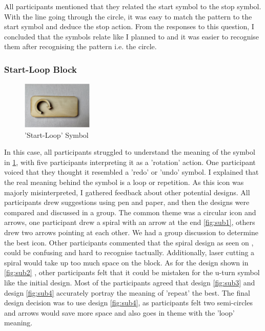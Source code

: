 \documentclass[oneside,%
                    author={Malak Hajji},
                    degree={BSc},
                    title={Designing An Accessible Computational Toolkit For Students},
                  subtitle={With Mixed Visual Abilities}]{dissertation}
\begin{document}
All participants mentioned that they related the start symbol to the stop symbol. With the line going through the circle, it was easy to match the pattern to the start symbol and deduce the stop action. From the responses to this question, I concluded that the symbols relate like I planned to and it was easier to recognise them after recognising the pattern i.e. the circle. 

\subsubsection{Start-Loop Block}

\FloatBarrier
\begin{figure}[h]
    \centering
    \includegraphics[width=0.3\textwidth]{thesis/loopstart.eps}
    \caption{'Start-Loop' Symbol}
    \label{fig-startloop}
\end{figure}
\FloatBarrier
In this case, all participants struggled to understand the meaning of the symbol in \ref{fig-startloop}, with five participants interpreting it as a 'rotation' action. One participant voiced that they thought it resembled a 'redo' or 'undo' symbol. I explained that the real meaning behind the symbol is a loop or repetition. As this icon was majorly misinterpreted, I gathered feedback about other potential designs. All participants drew suggestions using pen and paper, and then the designs were compared and discussed in a group. The common theme was a circular icon and arrows, one participant drew a spiral with an arrow at the end \ref{fig:sub1}, others drew two arrows pointing at each other. We had a group discussion to determine the best icon. Other participants commented that the spiral design as seen on , could be confusing and hard to recognise tactually. Additionally, laser cutting a spiral would take up too much space on the block. As for the design shown in \ref{fig:sub2} , other participants felt that it could be mistaken for the u-turn symbol like the initial design. Most of the participants agreed that design \ref{fig:sub3} and design \ref{fig:sub4} accurately portray the meaning of 'repeat' the best. The final design decision was to use design \ref{fig:sub4}, as participants felt two semi-circles and arrows would save more space and also goes in theme with the 'loop' meaning.
\end{document}
